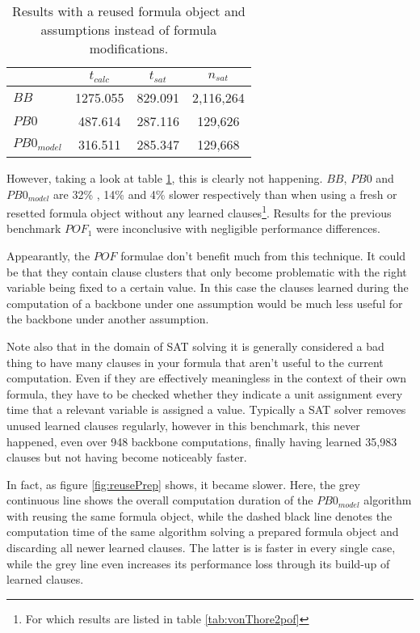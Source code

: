 \begin{table}[h]
\centering
\begin{tabular}{l| c c  c}
& $t_{calc}$ & $t_{sat}$ &  $n_{sat}$ \\
\hline
$BB$ & 1275.055 & 829.091 &  2,116,264 \\
$PB0$ & 487.614 & 287.116 &  129,626 \\
$PB0_{model}$ & 316.511 & 285.347 & 129,668 \\
\end{tabular}
\caption{Results with a reused formula object and assumptions instead of formula modifications.}
\label{tab:pofAssump}
\end{table}

However, taking a look at table \ref{tab:pofAssump}, this is clearly not happening. $BB$, $PB0$ and $PB0_{model}$ are 32\% , 14\% and 4\% slower respectively than when using a fresh or resetted formula object without any learned clauses\footnote{For which results are listed in table \ref{tab:vonThore2pof}}. Results for the previous benchmark $POF_1$ were inconclusive with negligible performance differences.

Appearantly, the $POF$ formulae don't benefit much from this technique. It could be that they contain clause clusters that only become problematic with the right variable being fixed to a certain value. In this case the clauses learned during the computation of a backbone under one assumption would be much less useful for the backbone under another assumption. 

Note also that in the domain of SAT solving it is generally considered a bad thing to have many clauses in your formula that aren't useful to the current computation. Even if they are effectively meaningless in the context of their own formula, they have to be checked whether they indicate a unit assignment every time that a relevant variable is assigned a value. Typically a SAT solver removes unused learned clauses regularly, however in this benchmark, this never happened, even over 948 backbone computations, finally having learned 35,983 clauses but not having become noticeably faster.

In fact, as figure \ref{fig:reusePrep} shows, it became slower. Here, the grey continuous line shows the overall computation duration of the $PB0_{model}$ algorithm with reusing the same formula object, while the dashed black line denotes the computation time of the same algorithm solving a prepared formula object and discarding all newer learned clauses. The latter is is faster in every single case, while the grey line even increases its performance loss through its build-up of learned clauses. 


